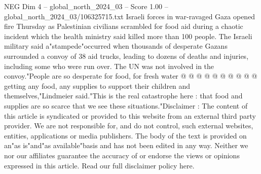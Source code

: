 \begin{textsample}{NEG Dim 4 – global\_north\_2024\_03 – Score 1.00 – global\_north\_2024\_03/106325715.txt}
Israeli forces in war-ravaged Gaza opened fire Thursday as Palestinian civilians scrambled for food aid during a chaotic incident which the health ministry said killed more than 100 people.
The Israeli military said a"stampede"occurred when thousands of desperate Gazans surrounded a convoy of 38 aid trucks, leading to dozens of deaths and injuries, including some who were run over.
The UN was not involved in the convoy."People are so desperate for food, for fresh water @ @ @ @ @ @ @ @ @ @ getting any food, any supplies to support their children and themselves,"Lindmeier said."This is the real catastrophe here : that food and supplies are so scarce that we see these situations."Disclaimer : The content of this article is syndicated or provided to this website from an external third party provider.
We are not responsible for, and do not control, such external websites, entities, applications or media publishers.
The body of the text is provided on an"as is"and"as available"basis and has not been edited in any way.
Neither we nor our affiliates guarantee the accuracy of or endorse the views or opinions expressed in this article.
Read our full disclaimer policy here.

\end{textsample}
